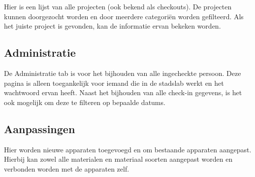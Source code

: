 Hier is een lijst van alle projecten (ook bekend als checkouts). De projecten kunnen doorgezocht worden en door meerdere categori\"en worden gefilteerd. Als het juiste project is gevonden, kan de informatie ervan bekeken worden.

\subsection{Administratie}
De Administratie tab is voor het bijhouden van alle ingecheckte persoon. Deze pagina is alleen toegankelijk voor iemand die in de stadslab werkt en het wachtwoord ervan heeft. Naast het bijhouden van alle check-in gegevens, is het ook mogelijk om deze te filteren op bepaalde datums.

\subsection{Aanpassingen}
Hier worden nieuwe apparaten toegevoegd en om bestaande apparaten aangepast. Hierbij kan zowel alle materialen en materiaal soorten aangepast worden en verbonden worden met de apparaten zelf.